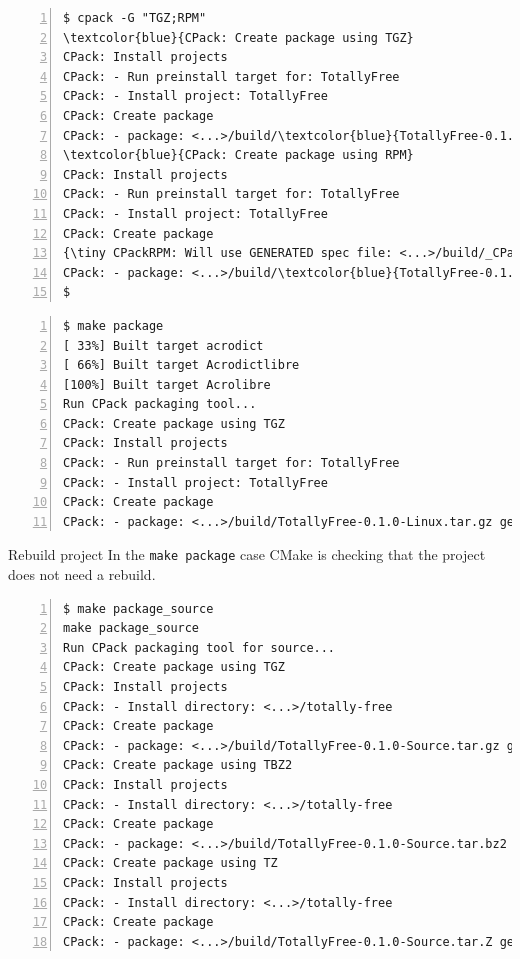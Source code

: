 \documentclass[compress,slidestop,table
              ]
               {beamer}
\newcommand{\fname}[1]{\texttt{#1}}
\begin{document}
\begin{frame}
\begin{Verbatim}[commandchars=\\\{\},fontsize=\scriptsize,numbers=left,frame=topline,label=cpack command line example]
$ cpack -G "TGZ;RPM"
\textcolor{blue}{CPack: Create package using TGZ}
CPack: Install projects
CPack: - Run preinstall target for: TotallyFree
CPack: - Install project: TotallyFree
CPack: Create package
CPack: - package: <...>/build/\textcolor{blue}{TotallyFree-0.1.0-Linux.tar.gz} generated.
\textcolor{blue}{CPack: Create package using RPM}
CPack: Install projects
CPack: - Run preinstall target for: TotallyFree
CPack: - Install project: TotallyFree
CPack: Create package
{\tiny CPackRPM: Will use GENERATED spec file: <...>/build/_CPack_Packages/Linux/RPM/SPECS/totallyfree.spec}
CPack: - package: <...>/build/\textcolor{blue}{TotallyFree-0.1.0-Linux.rpm} generated.
$
\end{Verbatim}
\begin{Verbatim}[commandchars=\\\{\},fontsize=\scriptsize,numbers=left,frame=topline,label=make package example]
$ make package
[ 33%] Built target acrodict
[ 66%] Built target Acrodictlibre
[100%] Built target Acrolibre
Run CPack packaging tool...
CPack: Create package using TGZ
CPack: Install projects
CPack: - Run preinstall target for: TotallyFree
CPack: - Install project: TotallyFree
CPack: Create package
CPack: - package: <...>/build/TotallyFree-0.1.0-Linux.tar.gz generated.
\end{Verbatim}
\begin{alertblock}{Rebuild project}
 In the \fname{make package} case CMake is checking that the project does not need a rebuild.
\end{alertblock}

\begin{Verbatim}[commandchars=\\\{\},fontsize=\scriptsize,numbers=left,frame=topline,label=make package\_source example]
$ make package_source
make package_source 
Run CPack packaging tool for source...
CPack: Create package using TGZ
CPack: Install projects
CPack: - Install directory: <...>/totally-free
CPack: Create package
CPack: - package: <...>/build/TotallyFree-0.1.0-Source.tar.gz generated.
CPack: Create package using TBZ2
CPack: Install projects
CPack: - Install directory: <...>/totally-free
CPack: Create package
CPack: - package: <...>/build/TotallyFree-0.1.0-Source.tar.bz2 generated.
CPack: Create package using TZ
CPack: Install projects
CPack: - Install directory: <...>/totally-free
CPack: Create package
CPack: - package: <...>/build/TotallyFree-0.1.0-Source.tar.Z generated.
\end{Verbatim}
\end{frame}
\end{document}
